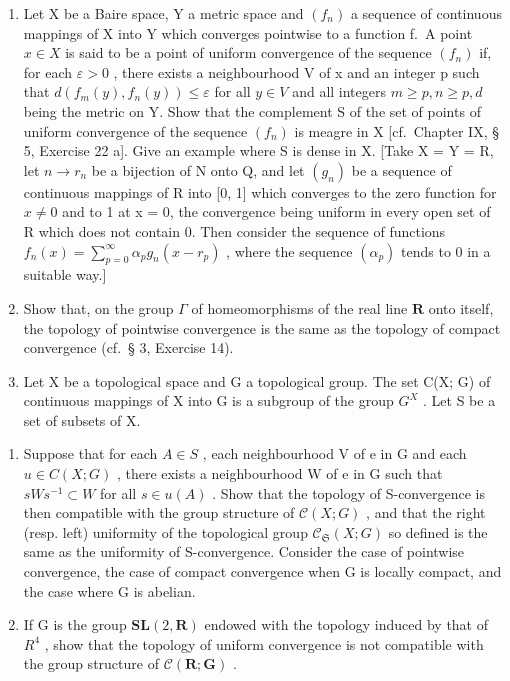 \begin{enumerate}
\def\labelenumi{\arabic{enumi})}
\setcounter{enumi}{8}
\item
  Let X be a Baire space, Y a metric space and \((f_{n})\) a sequence of continuous mappings of X into Y which converges pointwise to a function f.~A point \(x \in X\) is said to be a point of uniform convergence of the sequence \((f_{n})\) if, for each \(\varepsilon > 0\) , there exists a neighbourhood V of x and an integer p such that \(d(f_{m}(y), f_{n}(y)) \leqslant \varepsilon\) for all \(y \in V\) and all integers \(m \geqslant p, n \geqslant p, d\) being the metric on Y. Show that the complement S of the set of points of uniform convergence of the sequence \((f_{n})\) is meagre in X {[}cf.~Chapter IX, § 5, Exercise 22 a{]}. Give an example where S is dense in X. {[}Take X = Y = R, let \(n \to r_{n}\) be a bijection of N onto Q, and let \((g_{n})\) be a sequence of continuous mappings of R into {[}0, 1{]} which converges to the zero function for \(x \neq 0\) and to 1 at x = 0, the convergence being uniform in every open set of R which does not contain 0. Then consider the sequence of functions \(f_{n}(x) = \sum_{p=0}^{\infty} \alpha_{p} g_{n}(x - r_{p})\) , where the sequence \((\alpha_{p})\) tends to 0 in a suitable way.{]}
\item
  Show that, on the group \(\Gamma\) of homeomorphisms of the real line \(\mathbf{R}\) onto itself, the topology of pointwise convergence is the same as the topology of compact convergence (cf.~§ 3, Exercise 14).
\item
  Let X be a topological space and G a topological group. The set C(X; G) of continuous mappings of X into G is a subgroup of the group \(G^{X}\) . Let S be a set of subsets of X.
\end{enumerate}

\begin{enumerate}
\def\labelenumi{\alph{enumi})}
\item
  Suppose that for each \(A \in S\) , each neighbourhood V of e in G and each \(u \in C(X; G)\) , there exists a neighbourhood W of e in G such that \(sWs^{-1} \subset W\) for all \(s \in u(A)\) . Show that the topology of S-convergence is then compatible with the group structure of \(\mathcal{C}(X; G)\) , and that the right (resp. left) uniformity of the topological group \(\mathcal{C}_{\mathfrak{S}}(X; G)\) so defined is the same as the uniformity of S-convergence. Consider the case of pointwise convergence, the case of compact convergence when G is locally compact, and the case where G is abelian.
\item
  If G is the group \(\mathbf{SL}(2, \mathbf{R})\) endowed with the topology induced by that of \(R^{4}\) , show that the topology of uniform convergence is not compatible with the group structure of \(\mathcal{C}(\mathbf{R}; \mathbf{G})\) .
\end{enumerate}

